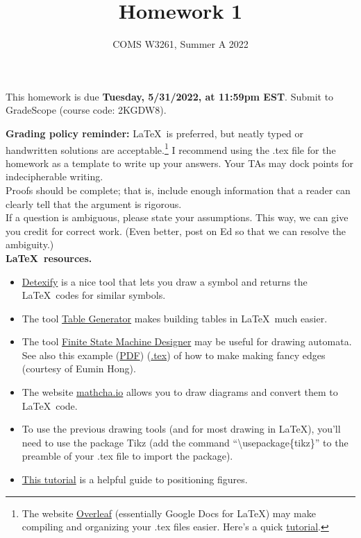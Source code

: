 \documentclass[letterpaper,11pt,twoside]{article}
\title{Homework 1}
\date{COMS W3261, Summer A 2022}
\theoremstyle{plain}
\theoremstyle{definition}
\theoremstyle{remark}
\theoremstyle{restate}
\begin{document}
\maketitle

This homework is due \textbf{Tuesday, 5/31/2022, at 11:59pm EST}. Submit to GradeScope (course code: 2KGDW8).

\textbf{Grading policy reminder:} \LaTeX~is preferred, but neatly typed or handwritten solutions are acceptable.\footnote{The website \href{https://www.overleaf.com/}{Overleaf} (essentially Google Docs for LaTeX) may make compiling and organizing your .tex files easier. Here's a quick \href{https://www.overleaf.com/learn/latex/Learn_LaTeX_in_30_minutes}{tutorial}.} I recommend using the .tex file for the homework as a template to write up your answers. Your TAs may dock points for indecipherable writing.\\

Proofs should be complete; that is, include enough information that a reader can clearly tell that the argument is rigorous. \\

If a question is ambiguous, please state your assumptions. This way, we can give you credit for correct work. (Even better, post on Ed so that we can resolve the ambiguity.) \\

\textbf{\LaTeX~resources.}
\begin{itemize}
    \item \href{https://detexify.kirelabs.org/classify.html}{Detexify} is a nice tool that lets you draw a symbol and returns the \LaTeX~codes for similar symbols. 
    \item The tool \href{https://www.tablesgenerator.com/}{Table Generator} makes building tables in \LaTeX~much easier.
    \item The tool \href{http://madebyevan.com/fsm/}{Finite State Machine Designer} may be useful for drawing automata. See also this example (\href{https://static.us.edusercontent.com/files/HZeTXimODzWeLvHIqsvjL2BG}{PDF}) (\href{https://static.us.edusercontent.com/files/RI3W8tQNvHMWFe9MkXV1KztA}{.tex}) of how to make making fancy edges (courtesy of Eumin Hong).
    \item The website \href{https://www.mathcha.io/}{mathcha.io} allows you to draw diagrams and convert them to \LaTeX~code.
    \item To use the previous drawing tools (and for most drawing in \LaTeX), you'll need to use the package Tikz (add the command ``\textbackslash usepackage\{tikz\}'' to the preamble of your .tex file to import the package). 
    \item \href{https://www.overleaf.com/learn/latex/Positioning_of_Figures}{This tutorial} is a helpful guide to positioning figures.
\end{itemize}  
\end{document}
